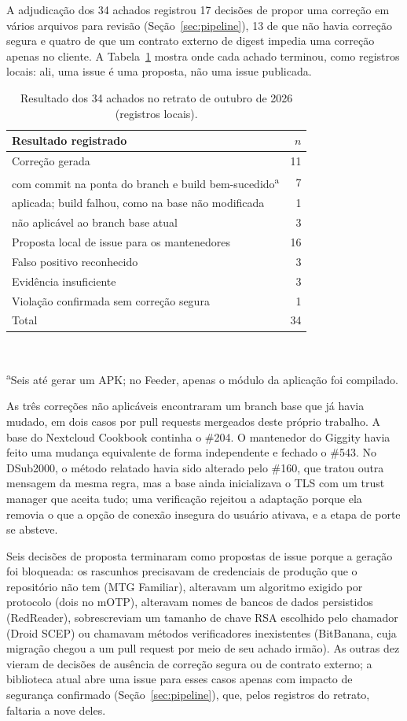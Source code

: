 \documentclass[conference]{IEEEtran}
\begin{document}
A adjudicação dos 34 achados registrou 17 decisões de propor uma correção em
vários arquivos para revisão (Seção~\ref{sec:pipeline}), 13 de que não havia
correção segura e quatro de que um contrato externo de digest impedia uma
correção apenas no cliente. A Tabela~\ref{tab:adjudication} mostra onde cada
achado terminou, como registros locais: ali, uma issue é uma proposta, não uma
issue publicada.

\begin{table}[H]
\centering
\caption{Resultado dos 34 achados no retrato de outubro de 2026 (registros
locais).}
\label{tab:adjudication}
\footnotesize
\begin{tabular}{p{6.1cm}r}
\toprule
Resultado registrado & $n$ \\
\midrule
Correção gerada & 11 \\
\quad com commit na ponta do branch e build bem-sucedido\textsuperscript{a} & 7 \\
\quad aplicada; build falhou, como na base não modificada & 1 \\
\quad não aplicável ao branch base atual & 3 \\
Proposta local de issue para os mantenedores & 16 \\
Falso positivo reconhecido & 3 \\
Evidência insuficiente & 3 \\
Violação confirmada sem correção segura & 1 \\
\midrule
Total & 34 \\
\bottomrule
\end{tabular}
\\[2pt]\raggedright\scriptsize\textsuperscript{a}Seis até gerar um APK; no Feeder,
apenas o módulo da aplicação foi compilado.
\end{table}

As três correções não aplicáveis encontraram um branch base que já havia mudado,
em dois casos por pull requests mergeados deste próprio trabalho. A base do
Nextcloud Cookbook continha o \#204. O mantenedor do Giggity havia feito uma
mudança equivalente de forma independente e fechado o \#543. No DSub2000, o método
relatado havia sido alterado pelo \#160, que tratou outra mensagem da mesma regra,
mas a base ainda inicializava o TLS com um trust manager que aceita tudo; uma
verificação rejeitou a adaptação porque ela removia o que a opção de conexão
insegura do usuário ativava, e a etapa de porte se absteve.

Seis decisões de proposta terminaram como propostas de issue porque a geração foi
bloqueada: os rascunhos precisavam de credenciais de produção que o repositório não tem (MTG
Familiar), alteravam um algoritmo exigido por protocolo (dois no mOTP), alteravam
nomes de bancos de dados persistidos (RedReader), sobrescreviam um tamanho de chave RSA escolhido pelo chamador
(Droid SCEP) ou chamavam métodos verificadores inexistentes (BitBanana, cuja
migração chegou a um pull request por meio de seu achado irmão). As outras dez vieram de
decisões de ausência de correção segura ou de contrato externo; a biblioteca atual abre uma
issue para esses casos apenas com impacto de segurança confirmado
(Seção~\ref{sec:pipeline}), que, pelos registros do retrato, faltaria a nove deles.
\end{document}
